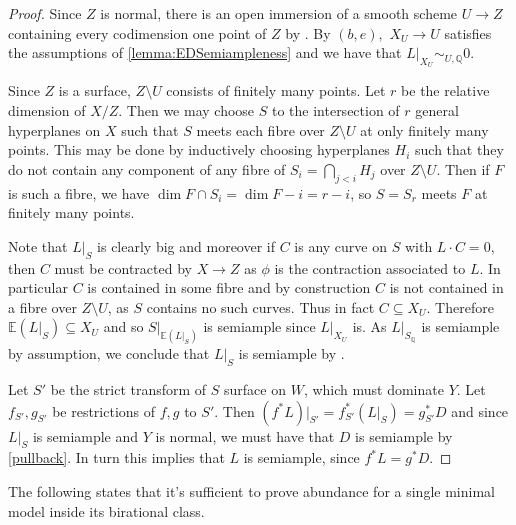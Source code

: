 \documentclass[a4paper,12pt]{book}
\begin{document}
	\begin{proof}
		
		Since $Z$ is normal, there is an open immersion of a smooth scheme $U \to Z$ containing every codimension one point of $Z$ by \cite[Tag 0ADD]{stacks-project}. By $(b,e),$ $X_{U} \to U$ satisfies the assumptions of \autoref{lemma:EDSemiampleness} and we have that $L|_{X_{U}} \sim_{U,\mathbb{Q}} 0$. 
		
		Since $Z$ is a surface, $Z \setminus U$ consists of finitely many points. Let $r$ be the relative dimension of $X/Z$. Then we may choose $S$ to the intersection of $r$ general hyperplanes on $X$ such that $S$ meets each fibre over $Z \setminus U$ at only finitely many points. This may be done by inductively choosing hyperplanes $H_{i}$ such that they do not contain any component of any fibre of $S_{i}=\bigcap_{j< i} H_{j}$ over $Z\setminus U$. Then if $F$ is such a fibre, we have $\dim F\cap S_{i}=\dim F-i=r-i$, so $S=S_{r}$ meets $F$ at finitely many points.
		
		Note that $L|_{S}$ is clearly big and moreover if $C$ is any curve on $S$ with $L \cdot C =0$, then $C$ must be contracted by $X \to Z$ as $\phi$ is the contraction associated to $L$. In particular $C$ is contained in some fibre and by construction $C$ is not contained in a fibre over $Z \setminus U$, as $S$ contains no such curves. Thus in fact $C \subseteq X_{U}$. Therefore $\mathbb{E}(L|_{S}) \subseteq X_{U}$ and so $S|_{\mathbb{E}(L|_{S})}$ is semiample since $L|_{X_{U}}$ is. As $L|_{S_{\mathbb{Q}}}$ is semiample by assumption, we conclude that $L|_{S}$ is semiample by \cite[Theorem 6.1]{witaszek2020keels}. 
		
		Let $S'$ be the strict transform of $S$ surface on $W$, which must dominate $Y$. Let $f_{S'}, g_{S'}$ be restrictions of $f,g$ to $S'$. Then $(f^{*}L)|_{S'}=f_{S'}^{*}(L|_{S})=g_{S'}^{*}D$ and since $L|_{S}$ is semiample and $Y$ is normal, we must have that $D$ is semiample by \autoref{pullback}. In turn this implies that $L$ is semiample, since $f^{*}L=g^{*}D$.			
	\end{proof}
	
	The following states that it's sufficient to prove abundance for a single minimal model inside its birational class.
	
\end{document}
